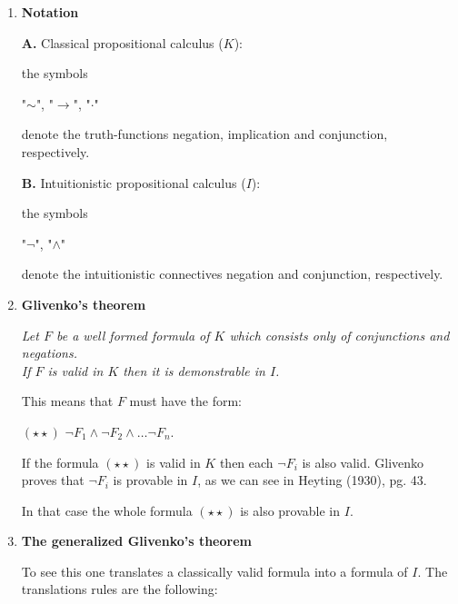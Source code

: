 \documentclass[12pt]{article}
\begin{document}
\begin{enumerate}
\item \textbf{Notation}

\textbf{A.} Classical propositional calculus ($K$):

the symbols 

\begin{center}
"$\sim$", "$\rightarrow$", "$\cdot$"
\end{center}

denote the truth-functions negation, implication and conjunction, respectively.

\textbf{B.} Intuitionistic propositional calculus ($I$):

the symbols

\begin{center}
"$\neg$", "$\wedge$"
\end{center}
 
denote the intuitionistic connectives negation and conjunction, respectively.

\item \textbf{Glivenko's theorem}

\begin{center}
\emph{Let $F$ be a well formed formula of $K$ which consists only of conjunctions and negations. \\  If $F$ is valid in $K$ then it is demonstrable in $I$.}
\end{center}

This means that $F$ must have the form:

\begin{center}
$(\star \star)$ \qquad \qquad $\neg F_1 \wedge \neg F_2 \wedge \ldots \neg F_n$.
\end{center}

If the formula $(\star \star)$ is valid in $K$ then each $\neg F_i$ is also valid. Glivenko proves that $\neg F_i$ is provable in $I$, as we can see in Heyting (1930), pg. 43.

In that case the whole formula $(\star \star)$ is also provable in $I$.

\item \textbf{The generalized Glivenko's theorem}

\begin{center}
\end{center}

To see this one translates a classically valid formula into a formula of $I$. The translations rules are the following:


\end{enumerate}
\end{document}
